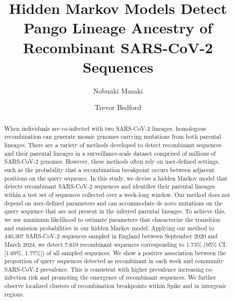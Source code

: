\documentclass[11pt,oneside,letterpaper]{article}
\title{\vspace{1.0cm} \Large \bf 
Hidden Markov Models Detect Pango Lineage Ancestry of Recombinant SARS-CoV-2 Sequences 
}
\author[1]{Nobuaki Masaki}
\author[2]{Trevor Bedford}
\affil[1]{Department of Biostatistics, University of Washington, Seattle, WA}
\affil[2]{Vaccine and Infectious Disease Division, Fred Hutch Cancer Center, Seattle, WA}
\date{}
\begin{document}
\maketitle

\begin{abstract}
When individuals are co-infected with two SARS-CoV-2 lineages, homologous recombination can generate mosaic genomes carrying mutations from both parental lineages. There are a variety of methods developed to detect recombinant sequences and their parental lineages in a surveillance-scale dataset comprised of millions of SARS-CoV-2 genomes. However, these methods often rely on user-defined settings, such as the probability that a recombination breakpoint occurs between adjacent positions on the query sequence. In this study, we devise a hidden Markov model that detects recombinant SARS-CoV-2 sequences and identifies their parental lineages within a test set of sequences collected over a week-long window.  Our method does not depend on user-defined parameters and can accommodate de novo mutations on the query sequence that are not present in the inferred parental lineages. To achieve this, we use maximum likelihood to estimate parameters that characterize the transition and emission probabilities in our hidden Markov model. Applying our method to 440,307 SARS-CoV-2 sequences sampled in England between September 2020 and March 2024, we detect 7,619 recombinant sequences corresponding to 1.73\% (95\% CI: [1.69\%, 1.77\%]) of all sampled sequences. We show a positive association between the proportion of query sequences detected as recombinant in each week and community SARS-CoV-2 prevalence. This is consistent with higher prevalence increasing co-infection risk and promoting the emergence of recombinant sequences. We further observe localized clusters of recombination breakpoints within Spike and in intergenic regions.
\end{abstract}


\end{document}
